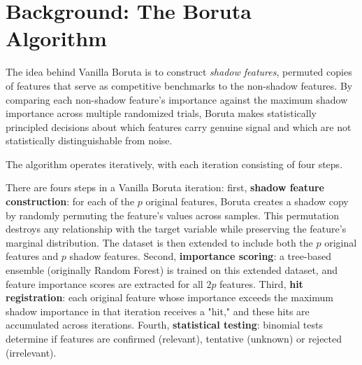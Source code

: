 \documentclass[runningheads]{llncs}
\begin{document}
\section{Background: The Boruta Algorithm}
\label{sec:background}

The idea behind Vanilla Boruta is to construct \emph{shadow features}, permuted copies of features that serve as competitive benchmarks to the non-shadow features. By comparing each non-shadow feature's importance against the maximum shadow importance across multiple randomized trials, Boruta makes statistically principled decisions about which features carry genuine signal and which are not statistically distinguishable from noise.

The algorithm operates iteratively, with each iteration consisting of four steps.

There are fours steps in a Vanilla Boruta iteration: first, \textbf{shadow feature construction}: for each of the $p$ original features, Boruta creates a shadow copy by randomly permuting the feature's values across samples. This permutation destroys any relationship with the target variable while preserving the feature's marginal distribution. The dataset is then extended to include both the $p$ original features and $p$ shadow features. Second, \textbf{importance scoring}: a tree-based ensemble (originally Random Forest) is trained on this extended dataset, and feature importance scores are extracted for all $2p$ features. Third, \textbf{hit registration}: each original feature whose importance exceeds the maximum shadow importance in that iteration receives a "hit," and these hits are accumulated across iterations. Fourth, \textbf{statistical testing}: binomial tests determine if features are confirmed (relevant), tentative (unknown) or rejected (irrelevant).
\end{document}
